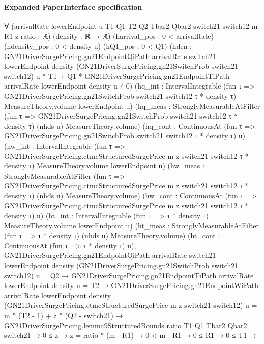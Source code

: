 \documentclass[10pt]{article}
\begin{document}
\paragraph{Expanded PaperInterface specification}
\begin{ReviewVerbatim}
∀ (arrivalRate lowerEndpoint u T1 Q1 T2 Q2 Tbar2 Qbar2 switch21 switch12 m R1 z ratio : ℝ) (density : ℝ → ℝ)
  (harrival_pos : 0 < arrivalRate) (hdensity_pos : 0 < density u) (hQ1_pos : 0 < Q1)
  (hden :
    GN21DriverSurgePricing.gn21EndpointQiPath arrivalRate switch21 lowerEndpoint density
            (GN21DriverSurgePricing.gn21SwitchProb switch21 switch12) u *
          T1 +
        Q1 * GN21DriverSurgePricing.gn21EndpointTiPath arrivalRate lowerEndpoint density u ≠
      0)
  (hq_int :
    IntervalIntegrable (fun τ => GN21DriverSurgePricing.gn21SwitchProb switch21 switch12 τ * density τ)
      MeasureTheory.volume lowerEndpoint u)
  (hq_meas :
    StronglyMeasurableAtFilter (fun τ => GN21DriverSurgePricing.gn21SwitchProb switch21 switch12 τ * density τ) (nhds u)
      MeasureTheory.volume)
  (hq_cont : ContinuousAt (fun τ => GN21DriverSurgePricing.gn21SwitchProb switch21 switch12 τ * density τ) u)
  (hw_int :
    IntervalIntegrable (fun τ => GN21DriverSurgePricing.ctmcStructuredSurgePrice m z switch21 switch12 τ * density τ)
      MeasureTheory.volume lowerEndpoint u)
  (hw_meas :
    StronglyMeasurableAtFilter
      (fun τ => GN21DriverSurgePricing.ctmcStructuredSurgePrice m z switch21 switch12 τ * density τ) (nhds u)
      MeasureTheory.volume)
  (hw_cont :
    ContinuousAt (fun τ => GN21DriverSurgePricing.ctmcStructuredSurgePrice m z switch21 switch12 τ * density τ) u)
  (ht_int : IntervalIntegrable (fun τ => τ * density τ) MeasureTheory.volume lowerEndpoint u)
  (ht_meas : StronglyMeasurableAtFilter (fun τ => τ * density τ) (nhds u) MeasureTheory.volume)
  (ht_cont : ContinuousAt (fun τ => τ * density τ) u),
  GN21DriverSurgePricing.gn21EndpointQiPath arrivalRate switch21 lowerEndpoint density
        (GN21DriverSurgePricing.gn21SwitchProb switch21 switch12) u =
      Q2 →
    GN21DriverSurgePricing.gn21EndpointTiPath arrivalRate lowerEndpoint density u = T2 →
      GN21DriverSurgePricing.gn21EndpointWiPath arrivalRate lowerEndpoint density
            (GN21DriverSurgePricing.ctmcStructuredSurgePrice m z switch21 switch12) u =
          m * (T2 - 1) + z * (Q2 - switch21) →
        GN21DriverSurgePricing.lemma9StructuredBounds ratio T1 Q1 Tbar2 Qbar2 switch21 →
          0 ≤ z →
            z = ratio * (m - R1) →
              0 < m - R1 →
                0 ≤ R1 →
                  0 ≤ T1 →

\end{ReviewVerbatim}
\end{document}
